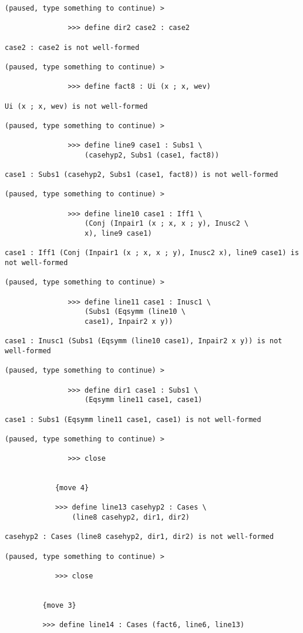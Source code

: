 \documentclass[12pt]{article}
\begin{document}
\begin{verbatim}
(paused, type something to continue) >

               >>> define dir2 case2 : case2

case2 : case2 is not well-formed

(paused, type something to continue) >

               >>> define fact8 : Ui (x ; x, wev)

Ui (x ; x, wev) is not well-formed

(paused, type something to continue) >

               >>> define line9 case1 : Subs1 \
                   (casehyp2, Subs1 (case1, fact8))

case1 : Subs1 (casehyp2, Subs1 (case1, fact8)) is not well-formed

(paused, type something to continue) >

               >>> define line10 case1 : Iff1 \
                   (Conj (Inpair1 (x ; x, x ; y), Inusc2 \
                   x), line9 case1)

case1 : Iff1 (Conj (Inpair1 (x ; x, x ; y), Inusc2 x), line9 case1) is not well-formed

(paused, type something to continue) >

               >>> define line11 case1 : Inusc1 \
                   (Subs1 (Eqsymm (line10 \
                   case1), Inpair2 x y))

case1 : Inusc1 (Subs1 (Eqsymm (line10 case1), Inpair2 x y)) is not well-formed

(paused, type something to continue) >

               >>> define dir1 case1 : Subs1 \
                   (Eqsymm line11 case1, case1)

case1 : Subs1 (Eqsymm line11 case1, case1) is not well-formed

(paused, type something to continue) >

               >>> close


            {move 4}

            >>> define line13 casehyp2 : Cases \
                (line8 casehyp2, dir1, dir2)

casehyp2 : Cases (line8 casehyp2, dir1, dir2) is not well-formed

(paused, type something to continue) >

            >>> close


         {move 3}

         >>> define line14 : Cases (fact6, line6, line13)


\end{verbatim}
\end{document}
